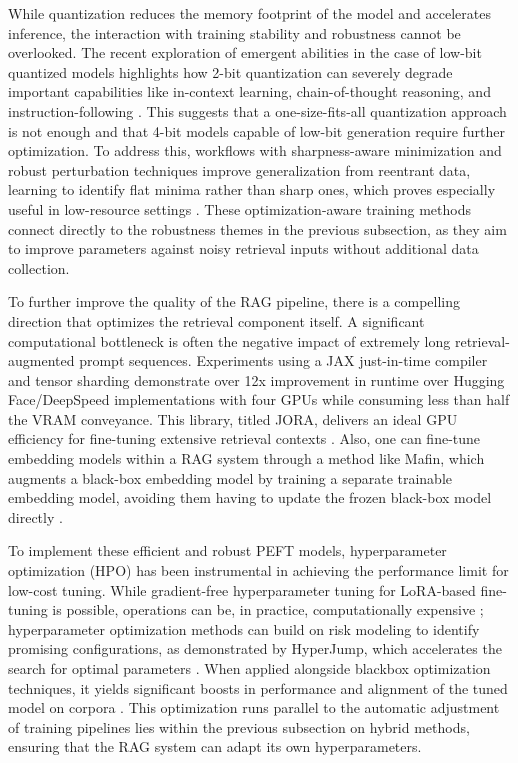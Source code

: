 \documentclass[11pt]{article}
\begin{document}
While quantization reduces the memory footprint of the model and accelerates inference, the interaction with training stability and robustness cannot be overlooked. The recent exploration of emergent abilities in the case of low-bit quantized models highlights how 2-bit quantization can severely degrade important capabilities like in-context learning, chain-of-thought reasoning, and instruction-following \cite{ref246}. This suggests that a one-size-fits-all quantization approach is not enough and that 4-bit models capable of low-bit generation require further optimization. To address this, workflows with sharpness-aware minimization and robust perturbation techniques improve generalization from reentrant data, learning to identify flat minima rather than sharp ones, which proves especially useful in low-resource settings \cite{ref247}. These optimization-aware training methods connect directly to the robustness themes in the previous subsection, as they aim to improve parameters against noisy retrieval inputs without additional data collection.

To further improve the quality of the RAG pipeline, there is a compelling direction that optimizes the retrieval component itself. A significant computational bottleneck is often the negative impact of extremely long retrieval-augmented prompt sequences. Experiments using a JAX just-in-time compiler and tensor sharding demonstrate over 12x improvement in runtime over Hugging Face/DeepSpeed implementations with four GPUs while consuming less than half the VRAM conveyance. This library, titled JORA, delivers an ideal GPU efficiency for fine-tuning extensive retrieval contexts \cite{ref70}. Also, one can fine-tune embedding models within a RAG system through a method like Mafin, which augments a black-box embedding model by training a separate trainable embedding model, avoiding them having to update the frozen black-box model directly \cite{ref67}.

To implement these efficient and robust PEFT models, hyperparameter optimization (HPO) has been instrumental in achieving the performance limit for low-cost tuning. While gradient-free hyperparameter tuning for LoRA-based fine-tuning is possible, operations can be, in practice, computationally expensive ; hyperparameter optimization methods can build on risk modeling to identify promising configurations, as demonstrated by HyperJump, which accelerates the search for optimal parameters \cite{ref248}. When applied alongside blackbox optimization techniques, it yields significant boosts in performance and alignment of the tuned model on corpora \cite{ref249}. This optimization runs parallel to the automatic adjustment of training pipelines lies within the previous subsection on hybrid methods, ensuring that the RAG system can adapt its own hyperparameters.
\end{document}

